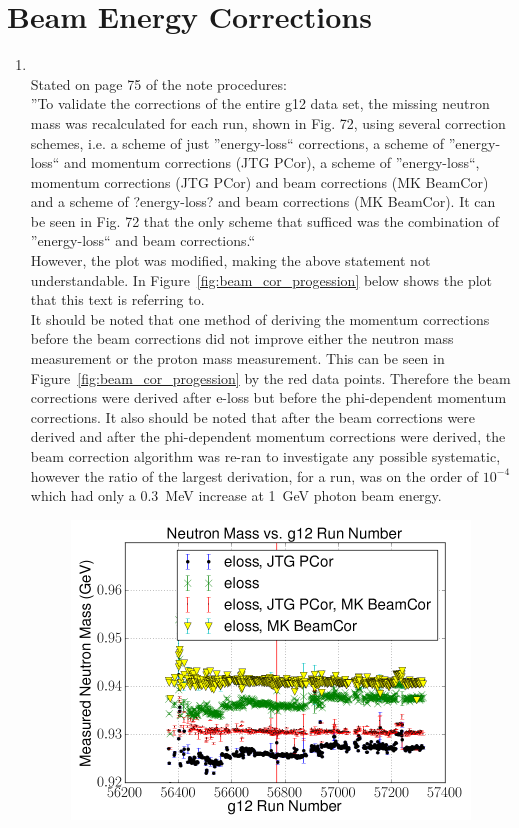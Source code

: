 \documentclass[10pt,a4paper]{article}
\begin{document}
	\section{Beam Energy Corrections}
\begin{enumerate}
	\item
	\\
	Stated on page 75 of the note procedures:\\
	''To validate the corrections of the entire g12 data set, the missing neutron mass was recalculated for each run, shown in Fig. 72, using several correction schemes, i.e. a scheme of just ''energy-loss`` corrections, a scheme of ''energy-loss`` and momentum corrections (JTG PCor), a scheme of ''energy-loss``, momentum corrections (JTG PCor) and beam corrections (MK BeamCor) and a scheme of ?energy-loss? and beam corrections (MK BeamCor). It can be seen in Fig. 72 that the only scheme that sufficed was the combination of ''energy-loss`` and beam corrections.``\\ However, the plot was modified, making the above statement not understandable. In Figure~\ref{fig:beam_cor_progession} below shows the plot that this text is referring to. \\
	It should be noted that one method of deriving the momentum corrections before the beam corrections did not improve either the neutron mass measurement or the proton mass measurement. This can be seen in Figure~\ref{fig:beam_cor_progession} by the red data points. Therefore the beam corrections were derived after e-loss but before the phi-dependent momentum corrections. It also should be noted that after the beam corrections were derived and after the phi-dependent momentum corrections were derived, the beam correction algorithm was re-ran to investigate any possible systematic, however the ratio of the largest derivation, for a run, was on the order of $10^{-4}$ which had only a 0.3~MeV increase at 1~GeV photon beam energy.
	\begin{figure}[h!]\begin{center}
	\includegraphics[width=200 pt,height=200 pt]{C3pi_allcorr_neutron_rxr.png}

\end{center}
\end{figure}
\end{enumerate}
\end{document}
